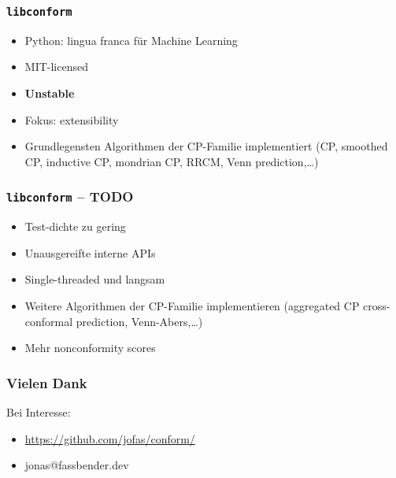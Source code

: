\documentclass{beamer}
\def\libconform{\texttt{libconform}}
\begin{document}
\begin{frame}
  \frametitle{\libconform}
  \pause
  \begin{itemize}[<+->]
    \item Python: lingua franca f\"ur Machine Learning

    \item MIT-licensed

    \item \textbf{Unstable}

    \item Fokus: extensibility

    \item Grundlegensten Algorithmen der CP-Familie
          implementiert (CP, smoothed CP, inductive CP,
          mondrian CP, RRCM, Venn prediction,\dots)

  \end{itemize}
\end{frame}

\begin{frame}
  \frametitle{\libconform{} -- TODO}
  \pause
  \begin{itemize}[<+->]
    \item Test-dichte zu gering

    \item Unausgereifte interne APIs

    \item Single-threaded und langsam

    \item Weitere Algorithmen der CP-Familie implementieren
          (aggregated CP cross-conformal prediction,
          Venn-Abers,\dots)

    \item Mehr nonconformity scores

  \end{itemize}
\end{frame}

\begin{frame}
  \frametitle{Vielen Dank}
  Bei Interesse:
  \begin{itemize}
    \item \url{https://github.com/jofas/conform/}
    \item jonas@fassbender.dev
  \end{itemize}
\end{frame}
\end{document}
